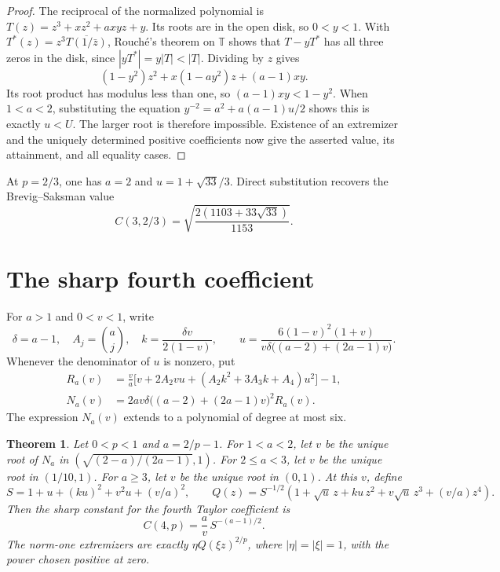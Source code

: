 \documentclass[11pt]{article}
\newtheorem{theorem}{Theorem}
\newcommand{\T}{\mathbb T}
\begin{document}
\begin{proof}
The reciprocal of the normalized polynomial is
\(T(z)=z^3+xz^2+a x y z+y\). Its roots are in the open disk,
so \(0<y<1\). With \(T^*(z)=z^3\overline{T(1/\bar z)}\),
Rouch\'{e}'s theorem on \(\T\) shows that \(T-yT^*\) has all
three zeros in the disk, since \(|yT^*|=y|T|<|T|\).
Dividing by \(z\) gives
\[
 (1-y^2)z^2+x(1-a y^2)z+(a-1)xy .
\]
Its root product has modulus less than one, so
\((a-1)xy<1-y^2\). When \(1<a<2\), substituting the equation
\(y^{-2}=a^2+a(a-1)u/2\) shows this is exactly \(u<U\).
The larger root is therefore impossible. Existence of an
extremizer and the uniquely determined positive coefficients now
give the asserted value, its attainment, and all equality cases.
\end{proof}

At \(p=2/3\), one has \(a=2\) and \(u=1+\sqrt{33}/3\).
Direct substitution recovers the Brevig--Saksman value
\[
 C(3,2/3)=\sqrt{\frac{2(1103+33\sqrt{33})}{1153}} .
\]
\section{The sharp fourth coefficient}\label{sec:quartic}

For \(a>1\) and \(0<v<1\), write
\[
 \delta=a-1,\quad A_j=\binom aj,\quad
 k=\frac{\delta v}{2(1-v)},\qquad
 u=\frac{6(1-v)^2(1+v)}
          {v\delta\bigl((a-2)+(2a-1)v\bigr)}.
\]
Whenever the denominator of \(u\) is nonzero, put
\begin{align}
 R_a(v)&=\frac va\bigl[v+2A_2vu+
                   (A_2k^2+3A_3k+A_4)u^2\bigr]-1, \label{eq:quartic-residual}\\
 N_a(v)&=2av\delta\bigl((a-2)+(2a-1)v\bigr)^2 R_a(v).
 \label{eq:quartic-poly}
\end{align}
The expression \(N_a(v)\) extends to a polynomial of degree at most six.

\begin{theorem}\label{thm:quartic}
Let \(0<p<1\) and \(a=2/p-1\). For \(1<a<2\), let \(v\) be the
unique root of \(N_a\) in
\((\sqrt{(2-a)/(2a-1)},1)\). For \(2\le a<3\), let \(v\) be the
unique root in \((1/10,1)\). For \(a\ge3\), let \(v\) be the
unique root in \((0,1)\). At this \(v\), define
\[
 S=1+u+(ku)^2+v^2u+(v/a)^2,\qquad
 Q(z)=S^{-1/2}(1+\sqrt u\,z+ku\,z^2+v\sqrt u\,z^3+(v/a)z^4).
\]
Then the sharp constant for the fourth Taylor coefficient is
\[
 C(4,p)=\frac{a}{v}\,S^{-(a-1)/2}.
\]
The norm-one extremizers are exactly \(\eta Q(\xi z)^{2/p}\), where
\(|\eta|=|\xi|=1\), with the power chosen positive at zero.
\end{theorem}
\end{document}
